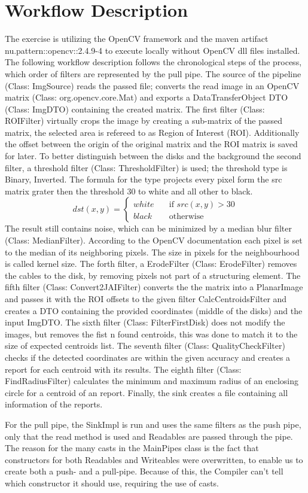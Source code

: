 \documentclass[a4paper, 11pt]{scrreprt}
\begin{document}
\chapter{Workflow Description}
The exercise is utilizing the OpenCV framework \parencite{intel_opencv_2019} and the maven artifact nu.pattern::opencv::2.4.9-4 to execute locally without OpenCV dll files installed.
The following workflow description follows the chronological steps of the process, which order of filters are represented by the pull pipe.
The source of the pipeline (Class: ImgSource) reads the passed file; converts the read image in an OpenCV matrix (Class: org.opencv.core.Mat) and exports a DataTransferObject DTO (Class: ImgDTO) containing the created matrix.
The first filter (Class: ROIFilter) virtually crops the image by creating a sub-matrix of the passed matrix, the selected area is refereed to as Region of Interest (ROI). Additionally the offset between the origin of the original matrix and the ROI matrix is saved for later.
To better distinguish between the disks and the background the second filter, a threshold filter (Class: ThresholdFilter) is used; the threshold type is Binary, Inverted.
The formula for the type \parencite{opencv_2.4.13.7_documentation_basic_nodate} projects every pixel form the src matrix grater then the threshold 30 to white and all other to black.
\[ dst(x, y) =
\begin{cases}
white       & \quad \text{if } src(x,y) > 30\\
black  & \quad \text{otherwise}
\end{cases}
\]
The result still contains noise, which can be minimized by a median blur filter (Class: MedianFilter). According to the OpenCV documentation \parencite{opencv_3.4.8_documentation_opencv:_nodate} each pixel is set to the median of its neighboring pixels.
The size in pixels for the neighbourhood is called kernel size.
The forth filter, a ErodeFilter (Class: ErodeFilter) removes the cables to the disk, by removing pixels not part of a structuring element.
The fifth filter (Class: Convert2JAIFilter) converts the the matrix into a PlanarImage and passes it with the ROI offsets to the given filter CalcCentroidsFilter and creates a DTO containing the provided coordinates (middle of the disks) and the input ImgDTO\@.
The sixth filter (Class: FilterFirstDisk) does not modify the images, but removes the fist n found centroids, this was done to match it to the size of expected centroids list.
The seventh filter (Class: QualityCheckFilter) checks if the detected coordinates are within the given accuracy and creates a report for each centroid with its results.
The eighth filter (Class: FindRadiusFilter) calculates the minimum and maximum radius of an enclosing circle for a centroid of an report.
Finally, the sink creates a file containing all information of the reports.

For the pull pipe, the SinkImpl is run and uses the same filters as the push pipe, only that the read method is used and
Readables are passed through the pipe.
The reason for the many casts in the MainPipes class is the fact that constructors for both Readables and Writeables were
overwritten, to enable us to create both a push- and a pull-pipe. Because of this, the Compiler can't tell which constructor
it should use, requiring the use of casts.
\printbibliography
\end{document}
